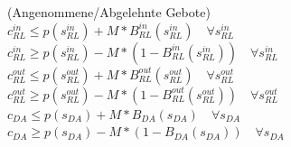 (Angenommene/Abgelehnte Gebote)\\
$c^{in}_{RL} \leq p(s^{in}_{RL}) + M * B^{in}_{RL}(s^{in}_{RL})\quad\forall s^{in}_{RL} $ \\
$c^{in}_{RL} \geq p(s^{in}_{RL}) - M * (1 - B^{in}_{RL}(s^{in}_{RL}))\quad\forall s^{in}_{RL} $ \\
$c^{out}_{RL} \leq p(s^{out}_{RL}) + M * B^{out}_{RL}(s^{out}_{RL})\quad\forall s^{out}_{RL} $ \\
$c^{out}_{RL} \geq p(s^{out}_{RL}) - M * (1 - B^{out}_{RL}(s^{out}_{RL}))\quad\forall s^{out}_{RL} $ \\
$c_{DA} \leq p(s_{DA}) + M * B_{DA}(s_{DA})\quad\forall s_{DA} $ \\
$c_{DA} \geq p(s_{DA}) - M * (1 - B_{DA}(s_{DA}))\quad\forall s_{DA} $ \\

